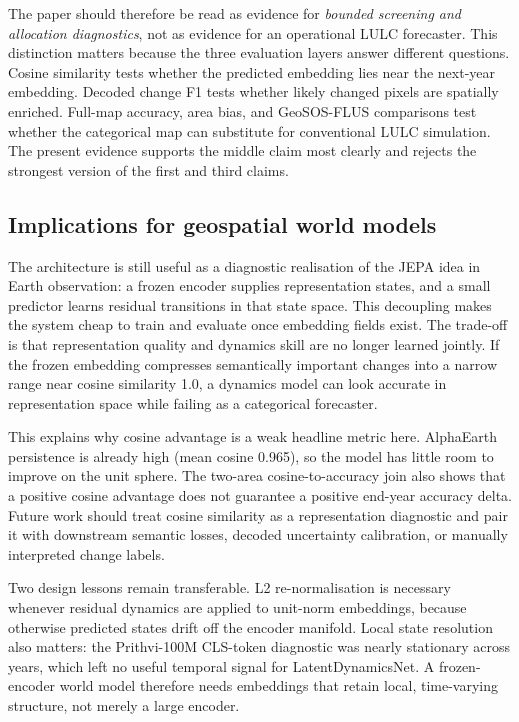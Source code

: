 \documentclass{article}
\begin{document}
The paper should therefore be read as evidence for \emph{bounded screening and allocation diagnostics}, not as evidence for an operational LULC forecaster. This distinction matters because the three evaluation layers answer different questions. Cosine similarity tests whether the predicted embedding lies near the next-year embedding. Decoded change F1 tests whether likely changed pixels are spatially enriched. Full-map accuracy, area bias, and GeoSOS-FLUS comparisons test whether the categorical map can substitute for conventional LULC simulation. The present evidence supports the middle claim most clearly and rejects the strongest version of the first and third claims.

\subsection{Implications for geospatial world models}

The architecture is still useful as a diagnostic realisation of the JEPA idea in Earth observation: a frozen encoder supplies representation states, and a small predictor learns residual transitions in that state space. This decoupling makes the system cheap to train and evaluate once embedding fields exist. The trade-off is that representation quality and dynamics skill are no longer learned jointly. If the frozen embedding compresses semantically important changes into a narrow range near cosine similarity 1.0, a dynamics model can look accurate in representation space while failing as a categorical forecaster.

This explains why cosine advantage is a weak headline metric here. AlphaEarth persistence is already high (mean cosine 0.965), so the model has little room to improve on the unit sphere. The two-area cosine-to-accuracy join also shows that a positive cosine advantage does not guarantee a positive end-year accuracy delta. Future work should treat cosine similarity as a representation diagnostic and pair it with downstream semantic losses, decoded uncertainty calibration, or manually interpreted change labels.

Two design lessons remain transferable. L2 re-normalisation is necessary whenever residual dynamics are applied to unit-norm embeddings, because otherwise predicted states drift off the encoder manifold. Local state resolution also matters: the Prithvi-100M CLS-token diagnostic was nearly stationary across years, which left no useful temporal signal for LatentDynamicsNet. A frozen-encoder world model therefore needs embeddings that retain local, time-varying structure, not merely a large encoder.
\end{document}
